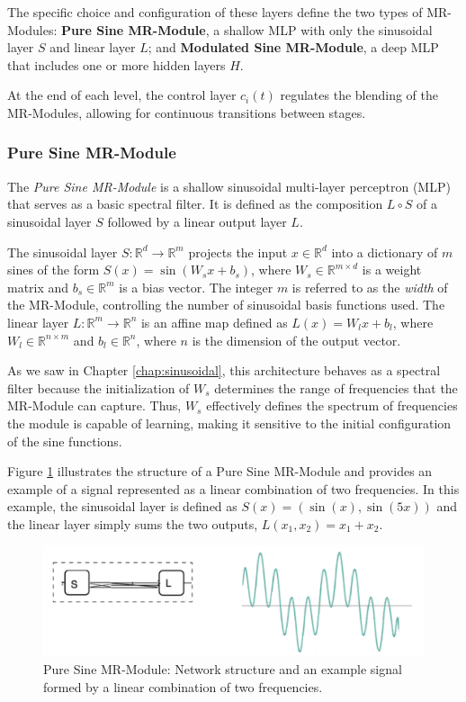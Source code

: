 The specific choice and configuration of these layers define the two types of MR-Modules: \textbf{Pure Sine MR-Module}, a shallow MLP with only the sinusoidal layer \( S \) and linear layer \( L \); and \textbf{Modulated Sine MR-Module}, a deep MLP that includes one or more hidden layers \( H \).

At the end of each level, the control layer \( c_i(t) \) regulates the blending of the MR-Modules, allowing for continuous transitions between stages.

\subsubsection{Pure Sine MR-Module}

The \textit{Pure Sine MR-Module} is a shallow sinusoidal multi-layer perceptron (MLP) that serves as a basic spectral filter. It is defined as the composition \( L \circ S \) of a sinusoidal layer \( S \) followed by a linear output layer \( L \). 

The sinusoidal layer \( S\!:\!\mathbb{R}^d\!\to\! \mathbb{R}^m \) projects the input \( x \in \mathbb{R}^d \) into a dictionary of \( m \) sines of the form \( S(x) = \sin\left(W_s x + b_s\right) \), where \( W_s \in \mathbb{R}^{m \times d} \) is a weight matrix and \( b_s \in \mathbb{R}^m \) is a bias vector. The integer \( m \) is referred to as the \textit{width} of the MR-Module, controlling the number of sinusoidal basis functions used. The linear layer \( L\!:\!\mathbb{R}^m\!\to\! \mathbb{R}^n \) is an affine map defined as \( L(x) = W_l x + b_l \), where \( W_l \in \mathbb{R}^{n \times m} \) and \( b_l \in \mathbb{R}^n \), where $n$ is the dimension of the output vector.

As we saw in Chapter \ref{chap:sinusoidal}, this architecture behaves as a spectral filter because the initialization of \( W_s \) determines the range of frequencies that the MR-Module can capture. Thus, \( W_s \) effectively defines the spectrum of frequencies the module is capable of learning, making it sensitive to the initial configuration of the sine functions.

Figure \ref{f:pure-sine} illustrates the structure of a Pure Sine MR-Module and provides an example of a signal represented as a linear combination of two frequencies. In this example, the sinusoidal layer is defined as \( S(x) = (\sin(x), \sin(5x)) \) and the linear layer simply sums the two outputs, \( L(x_1, x_2) = x_1 + x_2 \).

\begin{figure}[!h]
\centering
\includegraphics[width=0.8\linewidth]{img/ch4/pure-sine.png}
\caption{Pure Sine MR-Module: Network structure and an example signal formed by a linear combination of two frequencies.}
\label{f:pure-sine}
\end{figure}

